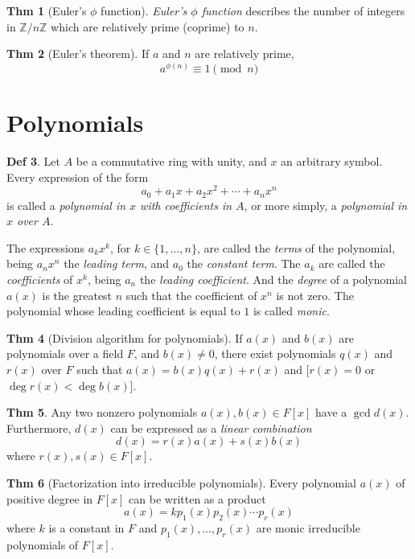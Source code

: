 \documentclass{article}
\theoremstyle{definition}
\newtheorem{definition}{Def}[section]
\newtheorem{theorem}[definition]{Thm}
\begin{document}
\begin{theorem}[Euler's $\phi$ function]
    \emph{Euler's $\phi$ function} describes the number of integers in $\mathbb{Z} / n \mathbb{Z}$ which are relatively prime (coprime) to $n$.
\end{theorem}

\begin{theorem}[Euler's theorem]
    If $a$ and $n$ are relatively prime, $$a^{\phi(n)} \equiv 1 \pmod n$$
\end{theorem}


\section{Polynomials}

\begin{definition}
    Let $A$ be a commutative ring with unity, and $x$ an arbitrary symbol. Every expression of the form
    $$a_0 + a_1 x + a_2 x^2 + \cdots + a_n x^n$$
    is called a \emph{polynomial in $x$ with coefficients in $A$}, or more simply, a \emph{polynomial in $x$ over $A$}.
\end{definition}
 The expressions $a_k x^k$, for $k \in \{ 1, \ldots, n \}$, are called the \emph{terms} of the polynomial, being $a_n x^n$ the \emph{leading term}, and $a_0$ the \emph{constant term}.
 The $a_k$ are called the \emph{coefficients} of $x^k$, being $a_n$ the \emph{leading coefficient}. And the \emph{degree} of a polynomial $a(x)$ is the greatest $n$ such that the coefficient of $x^n$ is not zero.
 The polynomial whose leading coefficient is equal to $1$ is called \emph{monic}.

\begin{theorem}[Division algorithm for polynomials]
    If $a(x)$ and $b(x)$ are polynomials over a field $F$, and $b(x) \neq 0$, there exist polynomials $q(x)$ and $r(x)$ over $F$ such that
    $a(x) = b(x) q(x) + r(x)$ and
    [$r(x) = 0$ or $\deg r(x) < \deg b(x)$].
\end{theorem}

\begin{theorem}
    Any two nonzero polynomials $a(x), b(x) \in F[x]$ have a $\gcd d(x)$. Furthermore, $d(x)$ can be expressed as a \emph{linear combination}
    $$d(x)= r(x) a(x) + s(x) b(x)$$
    where $r(x), s(x) \in F[x]$.
\end{theorem}

\begin{theorem}[Factorization into irreducible polynomials]
    Every polynomial $a(x)$ of positive degree in $F[x]$ can be written as a product
    $$a(x) = k p_1(x) p_2(x) \cdots p_r(x)$$
    where $k$ is a constant in $F$ and $p_1(x), \ldots, p_r(x)$ are monic irreducible polynomials of $F[x]$.
\end{theorem}
\end{document}
